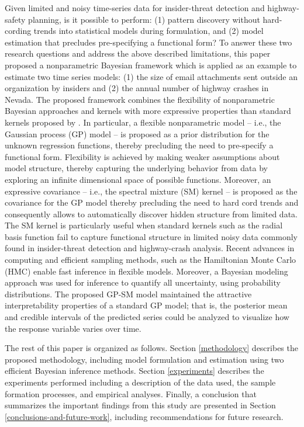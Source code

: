 \documentclass[letterpaper]{article}
\begin{document}
Given limited and noisy time-series data for insider-threat detection and highway-safety planning, is it possible to perform: (1) pattern discovery without hard-cording trends into statistical models during formulation, and (2) model estimation that precludes pre-specifying a functional form? To answer these two research questions and address the above described limitations, this paper proposed a nonparametric Bayesian framework which is applied as an example to estimate two time series models: (1) the size of email attachments sent outside an organization by insiders and (2) the annual number of highway crashes in Nevada. The proposed framework combines the flexibility of nonparametric Bayesian approaches \citep{williams2006gaussian,hjort2010bayesian,ghahramani2015probabilistic} and kernels with more expressive properties \citep{wilson2013gaussian, duvenaud2014automatic} than standard kernels proposed by \cite{williams2006gaussian}. In particular, a flexible nonparametric model -- i.e., the Gaussian process (GP) model --  is proposed as a prior distribution for the unknown regression functions, thereby precluding the need to pre-specify a functional form. Flexibility is achieved by making weaker assumptions about model structure, thereby capturing the underlying behavior from data by exploring an infinite dimensional space of possible functions. Moreover, an expressive covariance -- i.e., the spectral mixture (SM) kernel \citep{wilson2014covariance} -- is proposed as the covariance for the GP model thereby precluding the need to hard cord trends and consequently allows to automatically discover hidden structure from limited data. The SM kernel is particularly useful when standard kernels such as the radial basis function fail to capture functional structure \citep{schulz2017compositional} in limited noisy data commonly found in insider-threat detection and highway-crash analysis. Recent advances in computing and efficient sampling methods, such as the Hamiltonian Monte Carlo (HMC) \citep{hoffman2014no} enable fast inference in flexible models. Moreover, a Bayesian modeling approach was used for inference to quantify all uncertainty, using probability distributions. The proposed GP-SM model maintained the attractive interpretability properties of a standard GP model; that is, the posterior mean and credible intervals of the predicted series could be analyzed to visualize how the response variable varies over time. 

The rest of this paper is organized as follows. Section \ref{methodology} describes the proposed methodology, including model formulation and estimation using two efficient Bayesian inference methods. Section \ref{experiments} describes the experiments performed including a description of the data used, the sample formation processes, and empirical analyses. Finally, a conclusion that summarizes the important findings from this study are presented in Section \ref{conclusions-and-future-work}, including recommendations for future research.
 
\end{document}
